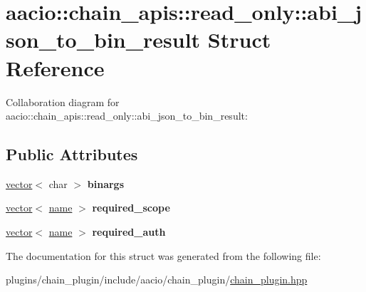 \hypertarget{structaacio_1_1chain__apis_1_1read__only_1_1abi__json__to__bin__result}{}\section{aacio\+:\+:chain\+\_\+apis\+:\+:read\+\_\+only\+:\+:abi\+\_\+json\+\_\+to\+\_\+bin\+\_\+result Struct Reference}
\label{structaacio_1_1chain__apis_1_1read__only_1_1abi__json__to__bin__result}


Collaboration diagram for aacio\+:\+:chain\+\_\+apis\+:\+:read\+\_\+only\+:\+:abi\+\_\+json\+\_\+to\+\_\+bin\+\_\+result\+:
\subsection*{Public Attributes}
\begin{DoxyCompactItemize}
\item 
\mbox{\label{structaacio_1_1chain__apis_1_1read__only_1_1abi__json__to__bin__result_ad764d78f54333283e9e632ddde843153}} 
\mbox{\hyperlink{classstd_1_1vector}{vector}}$<$ char $>$ {\bfseries binargs}
\item 
\mbox{\label{structaacio_1_1chain__apis_1_1read__only_1_1abi__json__to__bin__result_a3d9b44a40c91b95b75bc689b108b18a9}} 
\mbox{\hyperlink{classstd_1_1vector}{vector}}$<$ \mbox{\hyperlink{structaacio_1_1name}{name}} $>$ {\bfseries required\+\_\+scope}
\item 
\mbox{\label{structaacio_1_1chain__apis_1_1read__only_1_1abi__json__to__bin__result_a9fd0777007b376f05f80c963e828fa5a}} 
\mbox{\hyperlink{classstd_1_1vector}{vector}}$<$ \mbox{\hyperlink{structaacio_1_1name}{name}} $>$ {\bfseries required\+\_\+auth}
\end{DoxyCompactItemize}


The documentation for this struct was generated from the following file\+:\begin{DoxyCompactItemize}
\item 
plugins/chain\+\_\+plugin/include/aacio/chain\+\_\+plugin/\mbox{\hyperlink{chain__plugin_8hpp}{chain\+\_\+plugin.\+hpp}}\end{DoxyCompactItemize}
